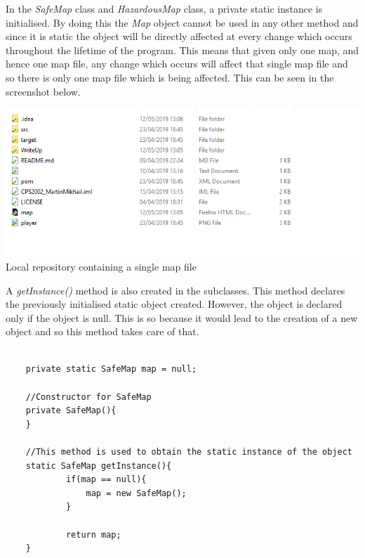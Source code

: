 \documentclass[a4paper,12pt]{extarticle}
\begin{document}
\noindent In the \textit{SafeMap} class and \textit{HazardousMap} class, a private static instance is initialised. By doing this the \textit{Map} object cannot be used in any other method and since it is static the object will be directly affected at every change which occurs throughout the lifetime of the program. This means that given only one map, and hence one map file, any change which occurs will affect that single map file and so there is only one map file which is being affected. This can be seen in the screenshot below.\\


\begin{center}
\includegraphics[scale=0.5]{Singleton1.png}\\
Local repository containing a single map file
\end{center}


\noindent A \textit{getInstance()} method is also created in the subclasses. This method declares the previously initialised static object created. However, the object is declared only if the object is null. This is so because it would lead to the creation of a new object and so this method takes care of that.\\

\newpage
\begin{lstlisting}

    private static SafeMap map = null;

    //Constructor for SafeMap
    private SafeMap(){
    }

    //This method is used to obtain the static instance of the object
    static SafeMap getInstance(){
            if(map == null){
                map = new SafeMap();
            }

            return map;
    }
    
\end{lstlisting}
\vspace{4mm}
\end{document}
